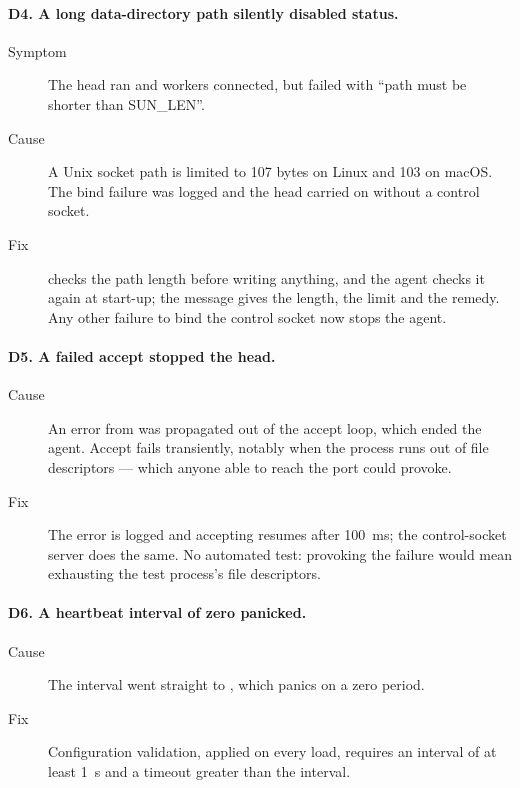 \documentclass{article}
\begin{document}
\paragraph{D4. A long data-directory path silently disabled status.}
\begin{description}
  \item[Symptom] The head ran and workers connected, but 
    failed with ``path must be shorter than SUN\_LEN''.
  \item[Cause] A Unix socket path is limited to 107 bytes on Linux and 103
    on macOS. The bind failure was logged and the head carried on without
    a control socket.
  \item[Fix]  checks the path length before writing
    anything, and the agent checks it again at start-up; the message gives
    the length, the limit and the remedy. Any other failure to bind the
    control socket now stops the agent.
\end{description}

\paragraph{D5. A failed accept stopped the head.}
\begin{description}
  \item[Cause] An error from  was propagated out of the
    accept loop, which ended the agent. Accept fails transiently, notably
    when the process runs out of file descriptors --- which anyone able to
    reach the port could provoke.
  \item[Fix] The error is logged and accepting resumes after 100~ms; the
    control-socket server does the same. No automated test: provoking the
    failure would mean exhausting the test process's file descriptors.
\end{description}

\paragraph{D6. A heartbeat interval of zero panicked.}
\begin{description}
  \item[Cause] The interval went straight to ,
    which panics on a zero period.
  \item[Fix] Configuration validation, applied on every load, requires an
    interval of at least 1~s and a timeout greater than the interval.
\end{description}
\end{document}
